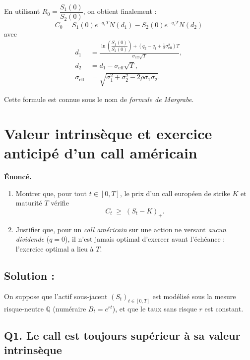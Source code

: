 En utilisant $R_0 = \dfrac{S_1(0)}{S_2(0)}$, on obtient finalement :
\[
\boxed{
C_0
= S_1(0)e^{-q_1 T} N(d_1)
- S_2(0)e^{-q_2 T} N(d_2)
}
\]
avec
\[
\boxed{
\begin{aligned}
d_1 &= \frac{\ln\!\left( \dfrac{S_1(0)}{S_2(0)} \right)
+ \left(q_2 - q_1 + \tfrac{1}{2}\sigma_{\text{eff}}^2\right)T}
{\sigma_{\text{eff}}\sqrt{T}},\\[6pt]
d_2 &= d_1 - \sigma_{\text{eff}}\sqrt{T},\\[6pt]
\sigma_{\text{eff}} &= \sqrt{\sigma_1^2 + \sigma_2^2 - 2\rho\sigma_1\sigma_2}.
\end{aligned}
}
\]

\medskip
Cette formule est connue sous le nom de \emph{formule de Margrabe}.


\section{Valeur intrinsèque et exercice anticipé d'un call américain}

\begin{exerciseBox}

\textbf{Énoncé.}
\begin{enumerate}
\item[(Q1)] Montrer que, pour tout $t \in [0,T]$, le prix d'un call européen de strike $K$ et maturité $T$ vérifie
\[
C_t \;\ge\; (S_t - K)_+.
\]
\item[(Q2)] Justifier que, pour un \emph{call américain} sur une action ne versant \emph{aucun dividende} ($q=0$), il n'est jamais optimal d'exercer avant l'échéance : l'exercice optimal a lieu à $T$.
\end{enumerate}
\end{exerciseBox}


\subsection*{Solution :}

On suppose que l'actif sous-jacent $(S_t)_{t\in[0,T]}$ est modélisé sous la mesure risque-neutre $\mathbb Q$ (numéraire $B_t=e^{rt}$), et que le taux sans risque $r$ est constant.

\subsection*{Q1. Le call est toujours supérieur à sa valeur intrinsèque}

